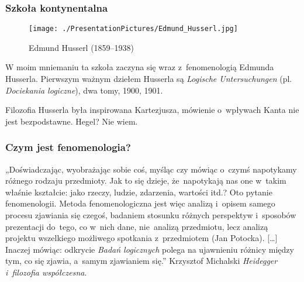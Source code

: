 \documentclass[10pt,t]{beamer}
\begin{document}
\begin{frame}
  \frametitle{Szkoła kontynentalna}


  \begin{figure}

    \centering

    \texttt{[image: ./PresentationPictures/Edmund\_Husserl.jpg]}


    \caption{Edmund Husserl (1859--1938)}

  \end{figure}



  W moim mniemaniu ta szkoła zaczyna się wraz z~fenomenologią Edmunda
  Husserla. Pierwszym ważnym dziełem Husserla są \textit{Logische
    Untersuchungen} (pl. \textit{Dociekania logiczne}), dwa tomy,
  1900, 1901.

  Filozofia Husserla była inspirowana Kartezjusza, mówienie o~wpływach
  Kanta nie jest bezpodstawne. Hegel? Nie wiem.

\end{frame}





\begin{frame}
  \frametitle{Czym jest fenomenologia?}


  „Doświadczając, wyobrażając sobie coś, myśląc czy mówiąc o~czymś
  napotykamy różnego rodzaju przedmioty. Jak to się dzieje,
  że~napotykają nas one w~takim właśnie kształcie: jako rzeczy,
  ludzie, zdarzenia, wartości itd.? Oto pytanie fenomenologii. Metoda
  fenomenologiczna jest więc analizą i~opisem samego procesu zjawiania
  się czegoś, badaniem stosunku różnych perspektyw i~sposobów
  prezentacji do~tego, co w~nich dane, nie~analizą przedmiotu, lecz
  analizą projektu wszelkiego możliwego spotkania z~przedmiotem (Jan
  Potocka). [\ldots] Inaczej mówiąc: odkrycie \textit{Badań logicznych}
  polega na ujawnieniu różnicy między tym, co się zjawia, a~samym
  zjawianiem się.” Krzysztof Michalski \textit{Heidegger i~filozofia
    współczesna}.

\end{frame}
\end{document}
